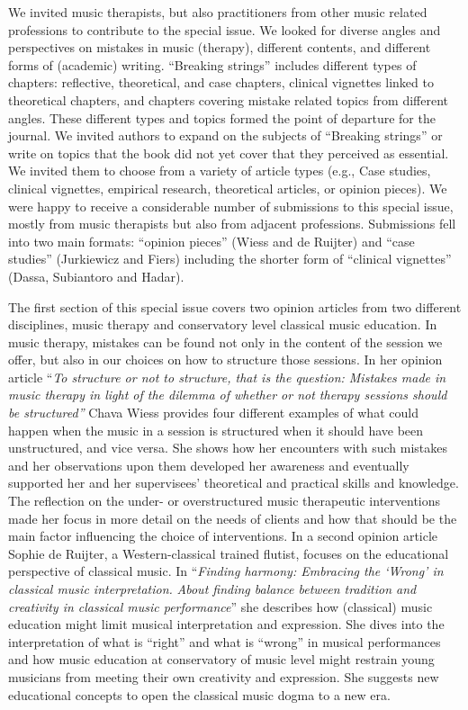 \documentclass[authordate, empirical, issue]{jote-new-article}
\begin{document}
We invited music therapists, but also practitioners from other music related professions to contribute to the special issue. We looked for diverse angles and perspectives on mistakes in music (therapy), different contents, and different forms of (academic) writing. “Breaking strings” includes different types of chapters: reflective, theoretical, and case chapters, clinical vignettes linked to theoretical chapters, and chapters covering mistake related topics from different angles. These different types and topics formed the point of departure for the journal. We invited authors to expand on the subjects of “Breaking strings” or write on topics that the book did not yet cover that they perceived as essential. We invited them to choose from a variety of article types (e.g., Case studies, clinical vignettes, empirical research, theoretical articles, or opinion pieces). We were happy to receive a considerable number of submissions to this special issue, mostly from music therapists but also from adjacent professions. Submissions fell into two main formats: “opinion pieces” (Wiess and de Ruijter) and “case studies” (Jurkiewicz and Fiers) including the shorter form of “clinical vignettes” (Dassa, Subiantoro and Hadar).



The first section of this special issue covers two opinion articles from two different disciplines, music therapy and conservatory level classical music education. In music therapy, mistakes can be found not only in the content of the session we offer, but also in our choices on how to structure those sessions. In her opinion article “\emph{To structure or not to structure, that is the question: Mistakes made in music therapy in light of the dilemma of whether or not therapy sessions should be structured”} Chava Wiess provides four different examples of what could happen when the music in a session is structured when it should have been unstructured, and vice versa. She shows how her encounters with such mistakes and her observations upon them developed her awareness and eventually supported her and her supervisees' theoretical and practical skills and knowledge. The reflection on the under- or overstructured music therapeutic interventions made her focus in more detail on the needs of clients and how that should be the main factor influencing the choice of interventions. In a second opinion article Sophie de Ruijter, a Western-classical trained flutist, focuses on the educational perspective of classical music. In “\emph{Finding harmony: Embracing the ‘Wrong' in classical music interpretation. }\emph{About finding balance between tradition and creativity in classical music performance}” she describes how (classical) music education might limit musical interpretation and expression. She dives into the interpretation of what is “right” and what is “wrong” in musical performances and how music education at conservatory of music level might restrain young musicians from meeting their own creativity and expression. She suggests new educational concepts to open the classical music dogma to a new era.
\end{document}

